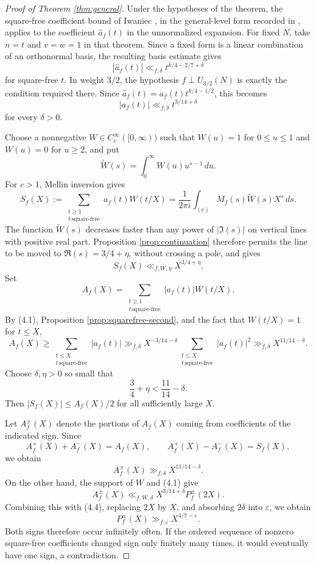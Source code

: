 \documentclass[10pt,a4paper]{amsart}
\begin{document}
\begin{proof}[Proof of Theorem \ref{thm:general}]
Under the hypotheses of the theorem, the square-free coefficient bound
of Iwaniec \cite{IwaniecCoeff}, in the general-level form recorded in
\cite[Theorem~1]{Waibel}, applies to the coefficient $\widehat a_f(t)$ in
the unnormalized expansion. For fixed $N$, take $n=t$ and $v=w=1$ in
that theorem. Since a fixed form is a linear combination of an
orthonormal basis, the resulting basis estimate gives
\[
|\widehat a_f(t)|\ll_{f,\delta}
t^{k/4-2/7+\delta}
\]
for square-free $t$. In weight $3/2$, the hypothesis
$f\perp U_{3/2}(N)$ is exactly the condition required there. Since
$\widehat a_f(t)=a_f(t)t^{k/4-1/2}$, this becomes
\[
|a_f(t)|\ll_{f,\delta}t^{3/14+\delta}
\tag{4.1}
\]
for every $\delta>0$.

Choose a nonnegative $W\in C_c^\infty([0,\infty))$ such that
$W(u)=1$ for $0\leq u\leq1$ and $W(u)=0$ for $u\geq2$, and put
\[
\widetilde W(s)=\int_0^\infty W(u)u^{s-1}\,du.
\]
For $c>1$, Mellin inversion gives
\[
S_f(X):=\sum_{\substack{t\ge1\\t\,\mathrm{square\text{-}free}}}
a_f(t)W(t/X)
=\frac{1}{2\pi i}\int_{(c)}M_f(s)\widetilde W(s)X^s\,ds.
\]
The function $\widetilde W(s)$ decreases faster than any power of
$|\Im(s)|$ on vertical lines with positive real part. Proposition
\ref{prop:continuation} therefore permits the line to be moved to
$\Re(s)=3/4+\eta$, without crossing a pole, and gives
\[
S_f(X)\ll_{f,W,\eta}X^{3/4+\eta}.
\tag{4.2}
\]
Set
\[
A_f(X)=\sum_{\substack{t\ge1\\ t\,\mathrm{square\text{-}free}}}|a_f(t)|W(t/X).
\]
By (4.1), Proposition \ref{prop:squarefree-second}, and the fact that
$W(t/X)=1$ for $t\le X$,
\[
A_f(X)
\ge \sum_{\substack{t\le X\\ t\,\mathrm{square\text{-}free}}}|a_f(t)|
\gg_{f,\delta}X^{-3/14-\delta}
\sum_{\substack{t\le X\\ t\,\mathrm{square\text{-}free}}}|a_f(t)|^2
\gg_{f,\delta}X^{11/14-\delta}.
\tag{4.3}
\]
Choose $\delta,\eta>0$ so small that
\[
\frac34+\eta<\frac{11}{14}-\delta.
\]
Then $|S_f(X)|\le A_f(X)/2$ for all sufficiently large $X$.

Let $A_f^\pm(X)$ denote the portions of $A_f(X)$ coming from coefficients of the indicated sign. Since
\[
A_f^+(X)+A_f^-(X)=A_f(X),
\qquad
A_f^+(X)-A_f^-(X)=S_f(X),
\]
we obtain
\[
A_f^\pm(X)\gg_{f,\delta}X^{11/14-\delta}.
\tag{4.4}
\]
On the other hand, the support of $W$ and (4.1) give
\[
A_f^\pm(X)\ll_{f,W,\delta}X^{3/14+\delta}P_f^\pm(2X).
\]
Combining this with (4.4), replacing $2X$ by $X$, and absorbing $2\delta$ into $\varepsilon$, we obtain
\[
P_f^\pm(X)\gg_{f,\varepsilon}X^{4/7-\varepsilon}.
\]
Both signs therefore occur infinitely often. If the ordered sequence of nonzero square-free coefficients changed sign only finitely many times, it would eventually have one sign, a contradiction.
\end{proof}
\end{document}

